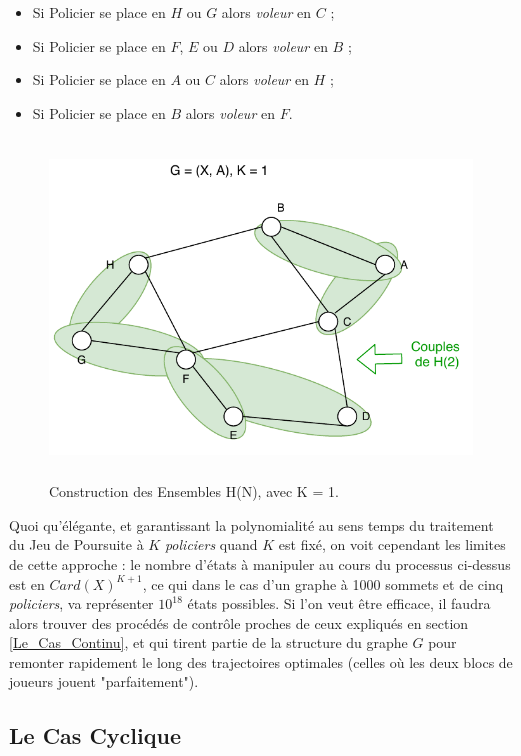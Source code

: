 {\begin{itemize}
	\begin{itemize}[label=$\square$]
		\item	Si Policier se place en $H$ ou $G$ alors \textit{voleur} en $C$ ; 
		\item	Si Policier se place en $F$, $E$ ou $D$ alors \textit{voleur} en $B$ ; 
		\item	Si Policier se place en $A$ ou $C$ alors \textit{voleur} en $H$ ; 
		\item	Si Policier se place en $B$ alors \textit{voleur} en $F$.
	\end{itemize}
\end{itemize}
\begin{figure}[H]
	\centerline{
		\includegraphics[height=9cm]{images_these/Construction.pdf}}
	\caption[Construction des Ensembles. ]{Construction des Ensembles H(N), avec K = 1.}
	\label{Construction}
\end{figure}

Quoi qu'élégante, et garantissant la polynomialité au sens temps du traitement du Jeu de Poursuite à $K$ \textit{policiers} quand $K$ est fixé, on voit cependant les limites de cette approche : le nombre d'états à manipuler au cours du processus ci-dessus est en $Card(X)^{K+1}$, ce qui dans le cas d'un graphe à 1000 sommets et de cinq \textit{policiers}, va représenter $10^{18}$ états possibles. Si l'on veut être efficace, il faudra alors trouver des procédés de contrôle proches de ceux expliqués en section \ref{Le_Cas_Continu}, et qui tirent partie de la structure du graphe $G$ pour remonter rapidement le long des trajectoires optimales (celles où les deux blocs de joueurs jouent "parfaitement"). 





}\subsection{Le Cas Cyclique}
\label{Le_Cas_Cyclique}

